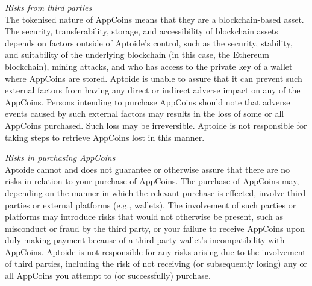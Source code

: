 \medskip

\textit{Risks from third parties}\\
The tokenised nature of AppCoins means that they are a blockchain-based asset. The security, transferability, storage, and accessibility of blockchain assets depends on factors outside of Aptoide's control, such as the security, stability, and suitability of the underlying blockchain (in this case, the Ethereum blockchain), mining attacks, and who has access to the private key of a wallet where AppCoins are stored. Aptoide is unable to assure that it can prevent such external factors from having any direct or indirect adverse impact on any of the AppCoins. Persons intending to purchase AppCoins should note that adverse events caused by such external factors may results in the loss of some or all AppCoins purchased. Such loss may be irreversible. Aptoide is not responsible for taking steps to retrieve AppCoins lost in this manner.

\medskip

\textit{Risks in purchasing AppCoins}\\
Aptoide cannot and does not guarantee or otherwise assure that there are no risks in relation to your purchase of AppCoins. The purchase of AppCoins may, depending on the manner in which the relevant purchase is effected, involve third parties or external platforms (e.g., wallets). The involvement of such parties or platforms may introduce risks that would not otherwise be present, such as misconduct or fraud by the third party, or your failure to receive AppCoins upon duly making payment because of a third-party wallet's incompatibility with AppCoins. Aptoide is not responsible for any risks arising due to the involvement of third parties, including the risk of not receiving (or subsequently losing) any or all AppCoins you attempt to (or successfully) purchase.










